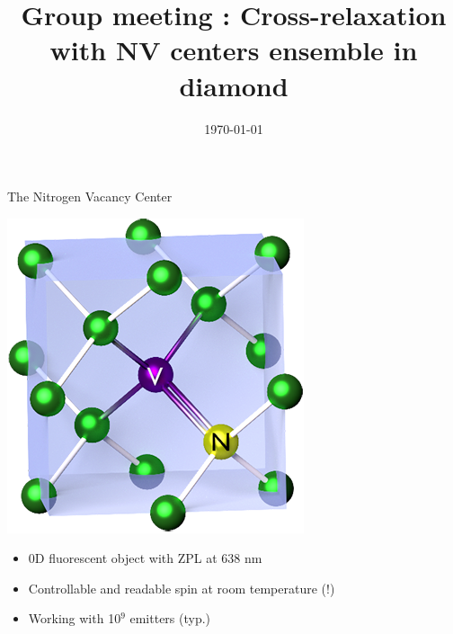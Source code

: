 \documentclass{beamer}
\title{Group meeting : Cross-relaxation with NV centers ensemble in diamond}
\date\today
\begin{document}
\begin{frame}
\maketitle
\end{frame}
\begin{frame}{The Nitrogen Vacancy Center}
\begin{center}
\includegraphics[scale=.4]{Nitrogen-vacancy_center}
\end{center}

\begin{itemize}
\item 0D fluorescent object with ZPL at 638 nm
\item Controllable and readable spin at room temperature (!)
\item Working with 10$^9$ emitters (typ.)
\end{itemize}
\end{frame}
\end{document}
